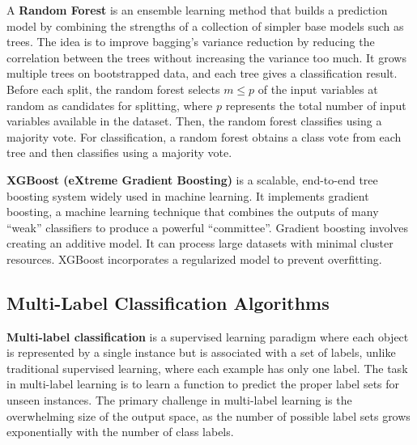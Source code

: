 A \textbf{Random Forest} is an ensemble learning method that builds a prediction model by combining the strengths of a collection of simpler base models such as trees. The idea is to improve bagging's variance reduction by reducing the correlation between the trees without increasing the variance too much. It grows multiple trees on bootstrapped data, and each tree gives a classification result. Before each split, the random forest selects $m \leq p$ of the input variables at random as candidates for splitting, where $p$ represents the total number of input variables available in the dataset. Then, the random forest classifies using a majority vote. For classification, a random forest obtains a class vote from each tree and then classifies using a majority vote. \cite{james2013}

\textbf{XGBoost (eXtreme Gradient Boosting)} is a scalable, end-to-end tree boosting system widely used in machine learning. It implements gradient boosting, a machine learning technique that combines the outputs of many ``weak'' classifiers to produce a powerful ``committee''. Gradient boosting involves creating an additive model. It can process large datasets with minimal cluster resources. XGBoost incorporates a regularized model to prevent overfitting. \cite{chen2016}

\subsection{Multi-Label Classification Algorithms}\label{subsec:multilabel-classification}
\textbf{Multi-label classification} is a supervised learning paradigm where each object is represented by a single instance but is associated with a set of labels, unlike traditional supervised learning, where each example has only one label. The task in multi-label learning is to learn a function to predict the proper label sets for unseen instances. The primary challenge in multi-label learning is the overwhelming size of the output space, as the number of possible label sets grows exponentially with the number of class labels. \cite{zhang2014}

